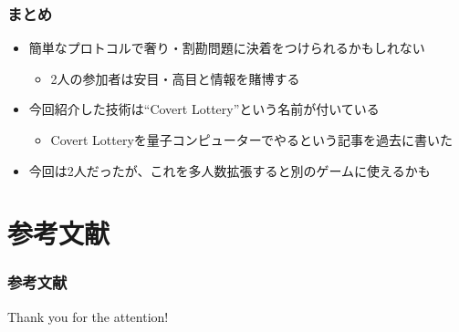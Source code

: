 \begin{frame}
  \frametitle{まとめ}

  \pause
  \begin{itemize}
    \item<+-> 簡単なプロトコルで奢り・割勘問題に決着をつけられるかもしれない
    \begin{itemize}
      \item 2人の参加者は安目・高目と情報を賭博する
    \end{itemize}

    \item<+-> 今回紹介した技術は``Covert Lottery\cite{covert_lottery}''という名前が付いている
    \begin{itemize}
      \item Covert Lotteryを量子コンピューターでやるという記事\cite{quantum_covert_lottery}を過去に書いた
    \end{itemize}

    \item<+-> 今回は2人だったが、これを多人数拡張すると別のゲームに使えるかも
  \end{itemize}
\end{frame}

\section*{参考文献}
\begin{frame}%
  \frametitle{参考文献}
  \nocite{*}
  
  
\end{frame}

\begin{frame}
  \centering
  {\Huge Thank you for the attention!}
\end{frame}


